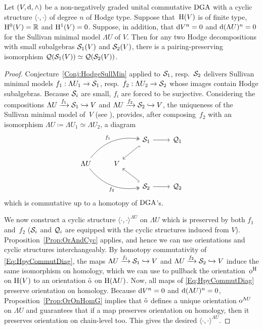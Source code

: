 \documentclass[\MainFolder/Text.tex]{subfiles}
\begin{document}
\begin{Conjecture}\label{Conj:UnieqSmal}
Let $(V,\mathrm{d},\wedge)$ be a non-negatively graded unital commutative $\mathrm{DGA}$ with a cyclic structure $\langle\cdot,\cdot\rangle$ of degree $n$ of Hodge type. Suppose that~$\mathrm{H}(V)$ is of finite type, $\mathrm{H}^0(V) = \mathbb{R}$ and $\mathrm{H}^1(V) = 0$. Suppose, in addition, that $\mathrm{d} V^n = 0$ and $\mathrm{d} (\Lambda U)^n = 0$ for the Sullivan minimal model $\Lambda U$ of $V$. Then for any two Hodge decompositions with small subalgebras $\mathcal{S}_1(V)$ and $\mathcal{S}_2(V)$, there is a pairing-preserving isomorphism $\mathcal{Q}(\mathcal{S}_1(V))\simeq\mathcal{Q}(\mathcal{S}_2(V))$.
\end{Conjecture}
\begin{proof}
Conjecture~\ref{Conj:HodgeSullMin} applied to $\mathcal{S}_1$, resp.~$\mathcal{S}_2$ delivers Sullivan minimal models $f_1: \Lambda U_1 \rightarrow \mathcal{S}_1$, resp.~$f_2: \Lambda U_2 \rightarrow \mathcal{S}_2$ whose images contain Hodge subalgebras. Because $\mathcal{S}_i$ are small, $f_i$ are forced to be surjective. Considering the compositions $\Lambda U \xrightarrow{f_1} \mathcal{S}_1 \xhookrightarrow{} V$ and $\Lambda U \xrightarrow{f_2} \mathcal{S}_2 \xhookrightarrow{} V$, the uniqueness of the Sullivan minimal model of~$V$ (see \cite[Theorem~2.24]{Felix2008}), provides, after composing~$f_2$ with an isomorphism $\Lambda U \coloneqq \Lambda U_1 \simeq \Lambda U_2$, a diagram
\begin{equation}\label{Eq:HpyCommutDiag}
\begin{tikzcd}
& & \VansSmall_1 \arrow[hook]{ld}\arrow{r} & \VansQuotient_1 \\
\Lambda U \arrow[bend left,two heads]{rru}{f_1}\arrow[bend right,two heads]{rrd}[below]{f_2}  &  V & &  \\
& & \VansSmall_2 \arrow[hook]{lu}\arrow{r}& \VansQuotient_2
\end{tikzcd}
\end{equation}
which is commutative up to a homotopy of $\mathrm{DGA}$'s.

We now construct a cyclic structure $\langle\cdot,\cdot\rangle^{\Lambda U}$ on $\Lambda U$ which is preserved by both $f_1$ and~$f_2$ ($\mathcal{S}_i$ and $\mathcal{Q}_i$ are equipped with the cyclic structures induced from $V$). Proposition~\ref{Prop:OrAndCyc} applies, and hence we can use orientations and cyclic structures interchangeably. By homotopy commutativity of \eqref{Eq:HpyCommutDiag}, the maps $\Lambda U \xrightarrow{f_1} \mathcal{S}_1 \xhookrightarrow{} V$ and $\Lambda U \xrightarrow{f_2} \mathcal{S}_2 \xhookrightarrow{} V$ induce the same isomorphism on homology, which we can use to pullback the orientation~$\mathrm{o}^{\mathrm{H}}$ on $\mathrm{H}(V)$ to an orientation $\tilde{\mathrm{o}}$ on $\mathrm{H}(\Lambda U)$. Now, all maps of \eqref{Eq:HpyCommutDiag} preserve orientation on homology. Because $\mathrm{d} V^n = 0$ and $\mathrm{d} (\Lambda U)^n = 0$, Proposition~\ref{Prop:OrOnHomG} implies that $\tilde{\mathrm{o}}$ defines a unique orientation $\mathrm{o}^{\Lambda U}$ on $\Lambda U$ and guarantees that if a map preserves orientation on homology, then it preserves orientation on chain-level too. This gives the desired $\langle\cdot,\cdot\rangle^{\Lambda U}$.


\end{proof}
\end{document}
